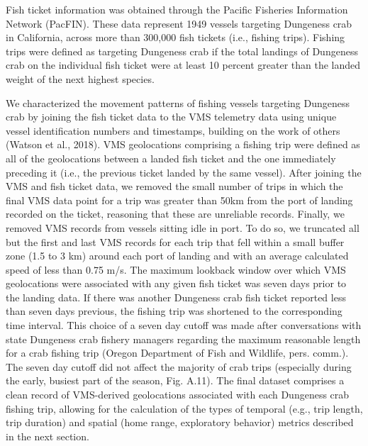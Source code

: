 \documentclass[]{elsarticle} %
\begin{document}
Fish ticket information was obtained through the Pacific Fisheries
Information Network (PacFIN). These data represent 1949 vessels
targeting Dungeness crab in California, across more than 300,000 fish
tickets (i.e., fishing trips). Fishing trips were defined as targeting
Dungeness crab if the total landings of Dungeness crab on the individual
fish ticket were at least 10 percent greater than the landed weight of
the next highest species.

We characterized the movement patterns of fishing vessels targeting
Dungeness crab by joining the fish ticket data to the VMS telemetry data
using unique vessel identification numbers and timestamps, building on
the work of others (Watson et al., 2018). VMS geolocations comprising a
fishing trip were defined as all of the geolocations between a landed
fish ticket and the one immediately preceding it (i.e., the previous
ticket landed by the same vessel). After joining the VMS and fish ticket
data, we removed the small number of trips in which the final VMS data
point for a trip was greater than 50km from the port of landing recorded
on the ticket, reasoning that these are unreliable records. Finally, we
removed VMS records from vessels sitting idle in port. To do so, we
truncated all but the first and last VMS records for each trip that fell
within a small buffer zone (1.5 to 3 km) around each port of landing and
with an average calculated speed of less than 0.75 m/s. The maximum
lookback window over which VMS geolocations were associated with any
given fish ticket was seven days prior to the landing data. If there was
another Dungeness crab fish ticket reported less than seven days
previous, the fishing trip was shortened to the corresponding time
interval. This choice of a seven day cutoff was made after conversations
with state Dungeness crab fishery managers regarding the maximum
reasonable length for a crab fishing trip (Oregon Department of Fish and
Wildlife, pers. comm.). The seven day cutoff did not affect the majority
of crab trips (especially during the early, busiest part of the season,
Fig. A.11). The final dataset comprises a clean record of VMS-derived
geolocations associated with each Dungeness crab fishing trip, allowing
for the calculation of the types of temporal (e.g., trip length, trip
duration) and spatial (home range, exploratory behavior) metrics
described in the next section.
\end{document}
